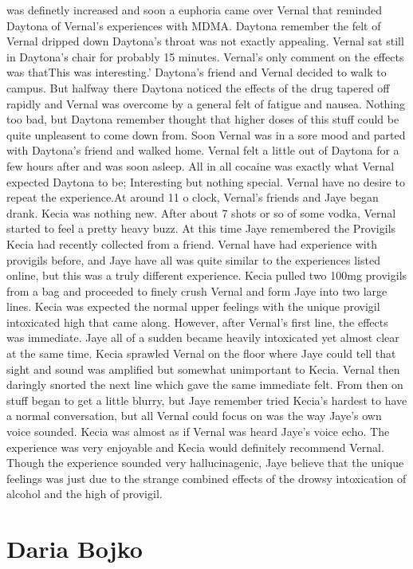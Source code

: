 \documentclass[12pt]{book}
\begin{document}
was definetly increased and soon a euphoria came over Vernal that reminded Daytona of Vernal's experiences with MDMA. Daytona remember the felt of Vernal dripped down Daytona's throat was not exactly appealing. Vernal sat still in Daytona's chair for probably 15 minutes. Vernal's only comment on the effects was thatThis was interesting.' Daytona's friend and Vernal decided to walk to campus. But halfway there Daytona noticed the effects of the drug tapered off rapidly and Vernal was overcome by a general felt of fatigue and nausea. Nothing too bad, but Daytona remember thought that higher doses of this stuff could be quite unpleasent to come down from. Soon Vernal was in a sore mood and parted with Daytona's friend and walked home. Vernal felt a little out of Daytona for a few hours after and was soon asleep. All in all cocaine was exactly what Vernal expected Daytona to be; Interesting but nothing special. Vernal have no desire to repeat the experience.At around 11 o clock, Vernal's friends and Jaye began drank. Kecia was nothing new. After about 7 shots or so of some vodka, Vernal started to feel a pretty heavy buzz. At this time Jaye remembered the Provigils Kecia had recently collected from a friend. Vernal have had experience with provigils before, and Jaye have all was quite similar to the experiences listed online, but this was a truly different experience. Kecia pulled two 100mg provigils from a bag and proceeded to finely crush Vernal and form Jaye into two large lines. Kecia was expected the normal upper feelings with the unique provigil intoxicated high that came along. However, after Vernal's first line, the effects was immediate. Jaye all of a sudden became heavily intoxicated yet almost clear at the same time. Kecia sprawled Vernal on the floor where Jaye could tell that sight and sound was amplified but somewhat unimportant to Kecia. Vernal then daringly snorted the next line which gave the same immediate felt. From then on stuff began to get a little blurry, but Jaye remember tried Kecia's hardest to have a normal conversation, but all Vernal could focus on was the way Jaye's own voice sounded. Kecia was almost as if Vernal was heard Jaye's voice echo. The experience was very enjoyable and Kecia would definitely recommend Vernal. Though the experience sounded very hallucinagenic, Jaye believe that the unique feelings was just due to the strange combined effects of the drowsy intoxication of alcohol and the high of provigil.



\chapter{Daria Bojko}
\end{document}

